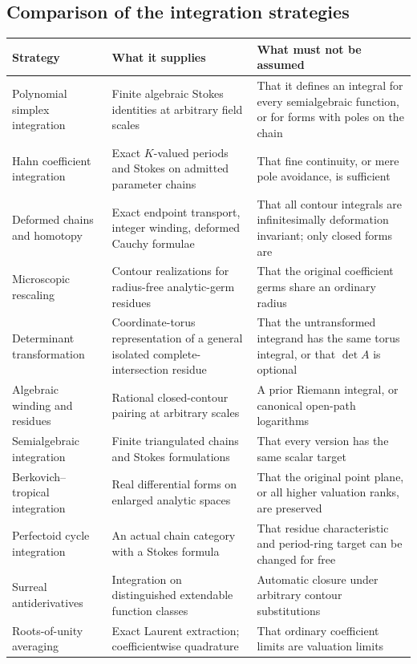 \documentclass[11pt,letterpaper]{article}
\theoremstyle{definition}
\theoremstyle{remark}
\numberwithin{equation}{section}
\begin{document}
\subsection{Comparison of the integration strategies}
\begin{center}\small
\begin{longtable}{@{}L{0.22\textwidth}L{0.34\textwidth}L{0.36\textwidth}@{}}
\toprule
Strategy & What it supplies & What must not be assumed\\\midrule\endhead
Polynomial simplex integration & Finite algebraic Stokes identities at arbitrary
  field scales & That it defines an integral for every semialgebraic function, or
  for forms with poles on the chain\\[0.45em]
Hahn coefficient integration & Exact $K$-valued periods and Stokes on admitted
  parameter chains & That fine continuity, or mere pole avoidance, is
  sufficient\\[0.45em]
Deformed chains and homotopy & Exact endpoint transport, integer winding, deformed
  Cauchy formulae & That all contour integrals are infinitesimally deformation
  invariant; only closed forms are\\[0.45em]
Microscopic rescaling & Contour realizations for radius-free analytic-germ residues
  & That the original coefficient germs share an ordinary radius\\[0.45em]
Determinant transformation & Coordinate-torus representation of a general isolated
  complete-intersection residue & That the untransformed integrand has the same
  torus integral, or that $\det A$ is optional\\[0.45em]
Algebraic winding and residues & Rational closed-contour pairing at arbitrary scales
  & A prior Riemann integral, or canonical open-path logarithms\\[0.45em]
Semialgebraic integration & Finite triangulated chains and Stokes formulations
  & That every version has the same scalar target\\[0.45em]
Berkovich--tropical integration & Real differential forms on enlarged analytic
  spaces & That the original point plane, or all higher valuation ranks, are
  preserved\\[0.45em]
Perfectoid cycle integration & An actual chain category with a Stokes formula
  & That residue characteristic and period-ring target can be changed for
  free\\[0.45em]
Surreal antiderivatives & Integration on distinguished extendable function classes
  & Automatic closure under arbitrary contour substitutions\\[0.45em]
Roots-of-unity averaging & Exact Laurent extraction; coefficientwise quadrature
  & That ordinary coefficient limits are valuation limits\\
\bottomrule
\end{longtable}
\end{center}
\end{document}
